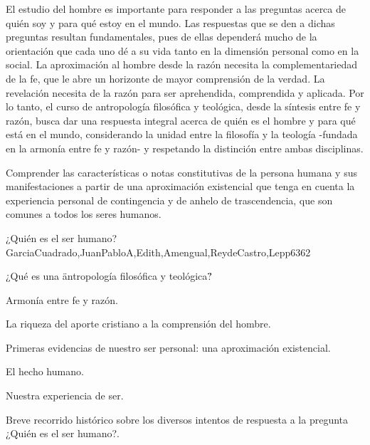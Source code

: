 \begin{syllabus}


\begin{justification}
El estudio del hombre es importante para responder a las preguntas acerca de quién soy y para qué estoy en el mundo. Las respuestas que se den a dichas preguntas resultan fundamentales, pues de ellas dependerá mucho de la orientación que cada uno dé a su vida tanto en la dimensión personal como en la social. La aproximación al hombre desde la razón necesita la complementariedad de la fe, que le abre un horizonte de mayor comprensión de la verdad. La revelación necesita de la razón para ser aprehendida, comprendida y aplicada. Por lo tanto, el curso de antropología filosófica y teológica, desde la síntesis entre fe y razón, busca dar una respuesta integral acerca de quién es el hombre y para qué está en el mundo, considerando la unidad entre la filosofía y la teología -fundada en la armonía entre fe y razón- y respetando la distinción entre ambas disciplinas.
\end{justification}

\begin{goals}
\item Comprender las características o notas constitutivas de la persona humana y sus manifestaciones a partir de una aproximación existencial que tenga en cuenta la experiencia personal de contingencia y de anhelo de trascendencia, que son comunes a todos los seres humanos.
\end{goals}

\begin{outcomes}
\end{outcomes}

\begin{unit}{¿Quién es el ser humano?}{GarciaCuadrado,JuanPabloA,Edith,Amengual,ReydeCastro,Lepp63}{6}{2}
\begin{topics}
 		\item ¿Qué es una \"antropología filosófica y teológica\"?
 		\item Armonía entre fe y razón.
 		\item La riqueza del aporte cristiano a la comprensión del hombre.
 		\item Primeras evidencias de nuestro ser personal: una aproximación existencial.
 		\item El hecho humano.
 		\item Nuestra experiencia de ser.
 		\item Breve recorrido histórico sobre los diversos intentos de respuesta a la pregunta ¿Quién es el ser humano?. 
\end{topics}


\end{unit}
\end{syllabus}
